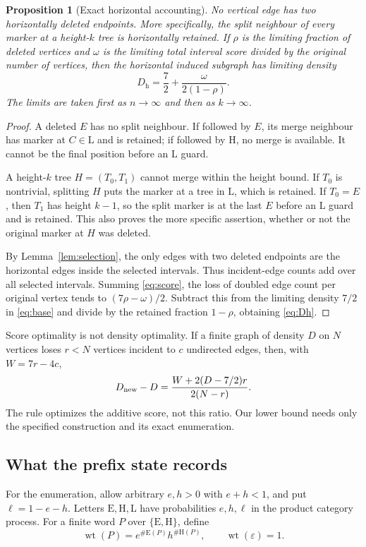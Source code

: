 \documentclass[11pt,a4paper]{article}
\newtheorem{proposition}[theorem]{Proposition}
\theoremstyle{definition}
\theoremstyle{remark}
\newcommand{\wt}{\operatorname{wt}}
\newcommand{\E}{\mathrm E}
\newcommand{\HH}{\mathrm H}
\newcommand{\LL}{\mathrm L}
\begin{document}
\begin{proposition}[Exact horizontal accounting]\label{prop:horizontal}
No vertical edge has two horizontally deleted endpoints. More specifically, the split neighbour of every marker at a height-$k$ tree is horizontally retained. If $\rho$ is the limiting fraction of deleted vertices and $\omega$ is the limiting total interval score divided by the original number of vertices, then the horizontal induced subgraph has limiting density
\begin{equation}\label{eq:Dh}
D_{\mathrm h}=\frac72+\frac{\omega}{2(1-\rho)}.
\end{equation}
The limits are taken first as $n\to\infty$ and then as $k\to\infty$.
\end{proposition}
\begin{proof}
A deleted $E$ has no split neighbour. If followed by $E$, its merge neighbour has marker at $C\in\LL$ and is retained; if followed by $\HH$, no merge is available. It cannot be the final position before an $\LL$ guard.

A height-$k$ tree $H=(T_0,T_1)$ cannot merge within the height bound. If $T_0$ is nontrivial, splitting $H$ puts the marker at a tree in $\LL$, which is retained. If $T_0=E$, then $T_1$ has height $k-1$, so the split marker is at the last $E$ before an $\LL$ guard and is retained. This also proves the more specific assertion, whether or not the original marker at $H$ was deleted.

By Lemma~\ref{lem:selection}, the only edges with two deleted endpoints are the horizontal edges inside the selected intervals. Thus incident-edge counts add over all selected intervals. Summing \eqref{eq:score}, the loss of doubled edge count per original vertex tends to $(7\rho-\omega)/2$. Subtract this from the limiting density $7/2$ in \eqref{eq:base} and divide by the retained fraction $1-\rho$, obtaining \eqref{eq:Dh}.
\end{proof}

Score optimality is not density optimality. If a finite graph of density $D$ on $N$ vertices loses $r<N$ vertices incident to $c$ undirected edges, then, with $W=7r-4c$,
\begin{equation}\label{eq:ratio-objective}
D_{\rm new}-D=\frac{W+2(D-7/2)r}{2(N-r)}.
\end{equation}
The rule optimizes the additive score, not this ratio. Our lower bound needs only the specified construction and its exact enumeration.

\subsection{What the prefix state records}\label{sec:prefix-states}
For the enumeration, allow arbitrary $e,h>0$ with $e+h<1$, and put $\ell=1-e-h$. Letters $\E,\HH,\LL$ have probabilities $e,h,\ell$ in the product category process. For a finite word $P$ over $\{\E,\HH\}$, define
\[
\wt(P)=e^{\#\E(P)}h^{\#\HH(P)},\qquad \wt(\varepsilon)=1.
\]
\end{document}
